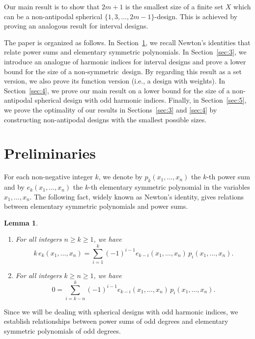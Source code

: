 \documentclass[11pt]{amsart}
\newtheorem{lem}[thm]{Lemma}
\theoremstyle{definition}
\newcommand{\nantipodal}{non-symmetric}
\begin{document}
Our main result is to show that $2m+1$ is the smallest size of a finite set $X$ which can be a non-antipodal spherical $\{1,3,\dots,2m-1\}$-design. This is achieved by proving an analogous result for interval designs.

The paper is organized as follows. In Section~\ref{sec:2}, we recall Newton's identities that relate power sums and elementary symmetric polynomials. In Section~\ref{sec:3}, we introduce an analogue of harmonic indices for interval designs and prove a lower bound for the size of a \nantipodal\ design. By regarding this result as a set version, we also prove its function version (i.e., a design with weights). In Section~\ref{sec:4}, we prove our main result on a lower bound for the size of a non-antipodal spherical design with odd harmonic indices. Finally, in Section~\ref{sec:5}, we prove the optimality of our results in Sections~\ref{sec:3} and \ref{sec:4} by constructing non-antipodal designs with the smallest possible sizes.

\section{Preliminaries}\label{sec:2}

For each non-negative integer \( k\), we denote by \( p_k(x_1, \dots, x_n) \) the \( k \)-th power sum and by \( e_k(x_1, \dots, x_n) \) the \( k \)-th elementary symmetric polynomial in the variables \( x_1, \dots, x_n \). The following fact, widely known as Newton's identity, gives relations between elementary symmetric polynomials and power sums.

\begin{lem}
\label{lem:Newton}
\begin{enumerate}
\item\label{Ni1} 
For all integers \( n \ge k \ge 1 \), we have
\[
k\, e_k(x_1,\ldots,x_n) = \sum_{i=1}^k (-1)^{i-1} e_{k-i}(x_1,\ldots,x_n) \, p_i(x_1,\ldots,x_n).
\]
\item\label{Ni2} 
For all integers \( k \ge n \ge 1 \), we have
\[
0 = \sum_{i=k-n}^k (-1)^{i-1} e_{k-i}(x_1,\ldots,x_n) \, p_i(x_1,\ldots,x_n).
\]
\end{enumerate}
\end{lem}

Since we will be dealing with spherical designs with odd harmonic indices, we establish relationships between power sums of odd degrees and elementary symmetric polynomials of odd degrees.
\end{document}
